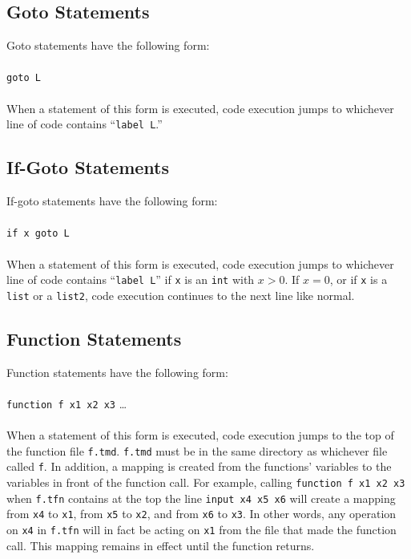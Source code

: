 \documentclass[11pt]{report}
\begin{document}
\subsection{Goto Statements}

Goto statements have the following form: \\ \\
\texttt{goto L} \\ \\ 
When a statement of this form is executed, code execution jumps to whichever line of code contains ``\texttt{label L}.''

\subsection{If-Goto Statements}

If-goto statements have the following form: \\ \\
\texttt{if x goto L} \\ \\ 
When a statement of this form is executed, code execution jumps to whichever line of code contains ``\texttt{label L}'' if \texttt{x} is an \texttt{int} with $x > 0$. If $x = 0$, or if \texttt{x} is a \texttt{list} or a \texttt{list2}, code execution continues to the next line like normal. \\

\subsection{Function Statements}

Function statements have the following form: \\ \\
\texttt{function f x1 x2 x3} \dots \\ \\ 
When a statement of this form is executed, code execution jumps to the top of the function file \texttt{f.tmd}. \texttt{f.tmd} must be in the same directory as whichever file called \texttt{f}. In addition, a mapping is created from the functions' variables to the variables in front of the function call. For example, calling \texttt{function f x1 x2 x3} when \texttt{f.tfn} contains at the top the line \texttt{input x4 x5 x6} will create a mapping from \texttt{x4} to \texttt{x1}, from \texttt{x5} to \texttt{x2}, and from \texttt{x6} to \texttt{x3}. In other words, any operation on \texttt{x4} in \texttt{f.tfn} will in fact be acting on \texttt{x1} from the file that made the function call. This mapping remains in effect until the function returns. \\
\end{document}
